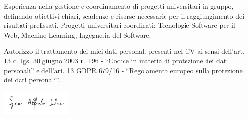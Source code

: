 \documentclass[9pt]{developercv} %
\begin{document}


Esperienza nella gestione e coordinamento di progetti universitari in gruppo, definendo obiettivi chiari, scadenze e risorse necessarie per il raggiungimento dei risultati prefissati. Progetti universitari coordinati: Tecnologie Software per il Web, Machine Learning, Ingegneria del Software.


\vfill
\footnotesize{Autorizzo il trattamento dei miei dati personali presenti nel CV ai sensi dell'art. 13 d. lgs. 30 giugno 2003 n. 196 - “Codice in materia di protezione
dei dati personali” e dell'art. 13 GDPR 679/16 - “Regolamento europeo sulla protezione dei dati personali”.}

\begin{flushright}
	\includegraphics[width=3.5cm]{images/firma.png}
\end{flushright}
\end{document}
